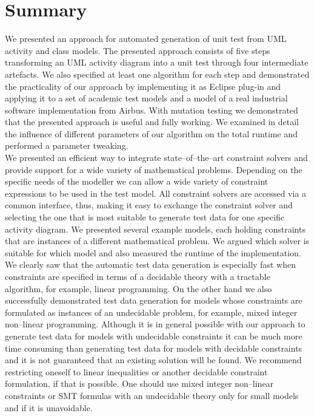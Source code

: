 \section{Summary}
We presented an approach for automated generation of unit test from UML activity and class models. The presented approach consists of five steps transforming an UML activity diagram into a unit test through four intermediate artefacts. We also specified at least one algorithm for each step and demonstrated the practicality of our approach by implementing it as Eclipse plug-in and applying it to a set of academic test models and a model of a real industrial software implementation from Airbus. With mutation testing we demonstrated that the presented approach is useful and fully working. We examined in detail the influence of different parameters of our algorithm on the total runtime and performed a parameter tweaking.\\
We presented an efficient way to integrate state--of--the--art constraint solvers and provide support for a wide variety of mathematical problems. Depending on the specific needs of the modeller we can allow a wide variety of constraint expressions to be used in the test model. All constraint solvers are accessed via a common interface, thus, making it easy to exchange the constraint solver and selecting the one that is most suitable to generate test data for one specific activity diagram. We presented several example models, each holding constraints that are instances of a different mathematical problem. We argued which solver is suitable for which model and also measured the runtime of the implementation. We clearly saw that the automatic test data generation is especially fast when constraints are specified in terms of a decidable theory with a tractable algorithm, for example, linear programming. On the other hand we also successfully demonstrated test data generation for models whose constraints are formulated as instances of an undecidable problem, for example, mixed integer non--linear programming. Although it is in general possible with our approach to generate test data for models with undecidable constraints it can be much more time consuming than generating test data for models with decidable constraints and it is not guaranteed that an existing solution will be found. We recommend restricting oneself to linear inequalities or another decidable constraint formulation, if that is possible. One should use mixed integer non--linear constraints or SMT formulas with an undecidable theory only for small models and if it is unavoidable.\\
